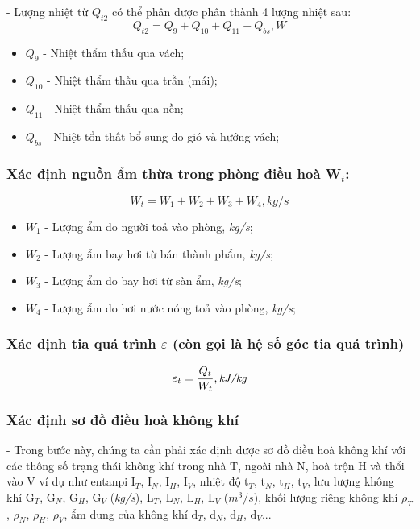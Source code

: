 - Lượng nhiệt từ $ Q_{t2} $ có thể phân được phân thành 4 lượng nhiệt sau:
\begin{equation}
	Q_{t2} = Q_{9} + Q_{10} + Q_{11} + Q_{bs}, \textit{W}
\end{equation}

\begin{itemize}[leftmargin = 3cm, label = $\ast$]
	\item $ Q_{9} $ - Nhiệt thẩm thấu qua vách;
	\item $ Q_{10} $ - Nhiệt thẩm thấu qua trần (mái);
	\item $ Q_{11} $ - Nhiệt thẩm thấu qua nền;
	\item $ Q_{bs} $ - Nhiệt tổn thất bổ sung do gió và hướng vách;
\end{itemize}


\subsubsection{Xác định nguồn ẩm thừa trong phòng điều hoà W$ _{t} $:}
\begin{equation}
	W_{t} = W_{1} + W_{2} + W_{3} + W_{4}, kg/s
\end{equation}

\begin{itemize}[leftmargin = 3cm, label = $\ast$]
	\item $ W_{1} $ - Lượng ẩm do người toả vào phòng, \textit{kg/s};
	\item $ W_{2} $ - Lượng ẩm bay hơi từ bán thành phẩm, \textit{kg/s};
	\item $ W_{3} $ - Lượng ẩm do bay hơi từ sàn ẩm, \textit{kg/s};
	\item $ W_{4} $ - Lượng ẩm do hơi nước nóng toả vào phòng, \textit{kg/s};	
\end{itemize}
	
\subsubsection{Xác định tia quá trình {\Large $\varepsilon$} (còn gọi là hệ số góc tia quá trình)}
\begin{equation}
	{\Large \varepsilon_{t}} =  \dfrac{Q_{t}}{W_{t}}, \textit{kJ/kg}
\end{equation}

\subsubsection{Xác định sơ đồ điều hoà không khí}
- Trong bước này, chúng ta cần phải xác định được sơ đồ điều hoà không khí với các thông số trạng thái không khí trong nhà T, ngoài nhà N, hoà trộn H và thổi vào V ví dụ như entanpi I$_{T}$, I$_{N}$, I$_{H}$, I$_{V}$, nhiệt độ t$_{T}$, t$_{N}$, t$_{H}$, t$_{V}$, lưu lượng không khí G$_{T}$, G$_{N}$, G$_{H}$, G$_{V}$ (\textit{kg/s}), L$_{T}$, L$_{N}$, L$_{H}$, L$_{V}$ (\textit{$m^3/s$}), khối lượng riêng không khí $\rho_{T}$, $\rho_{N}$, $\rho_{H}$, $\rho_{V}$, ẩm dung của không khí d$_{T}$, d$_{N}$, d$_{H}$, d$_{V}$...

